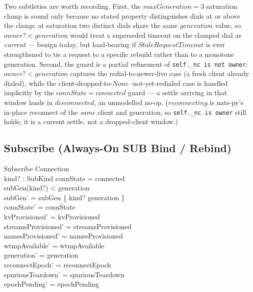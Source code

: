\documentclass[a4paper,10pt,fleqn]{article}
\begin{document}
Two subtleties are worth recording.  First, the $maxGeneration = 3$
saturation clamp is sound only because no stated property
distinguishes dials at or above the clamp: at saturation two
distinct dials share the same $generation$ value, so $owner? <
generation$ would treat a superseded timeout on the clamped dial as
\emph{current} --- benign today, but load-bearing if
$StaleRequestTimeout$ is ever strengthened to tie a request to a
specific rebuild rather than to a monotone generation.  Second, the
guard is a partial refinement of \texttt{self.\_nc is not owner}:
$owner? < generation$ captures the redial-to-newer-live case (a
fresh client already dialed), while the client-dropped-to-$None$
-not-yet-redialed case is handled implicitly by the $connState =
connected$ guard --- a settle arriving in that window lands in
$disconnected$, an unmodelled no-op.  ($reconnecting$ is nats-py's
in-place reconnect of the \emph{same} client and generation, so
\texttt{self.\_nc is owner} still holds; it is a current settle, not a
dropped-client window.)

\subsection{Subscribe (Always-On SUB Bind / Rebind)}

\begin{schema}{Subscribe}
  \Delta Connection \\
  kind? : SubKind
  \where
  connState = connected \\
  subGen(kind?) < generation \\
  subGen' = subGen \oplus \{ kind? \mapsto generation \} \\
  connState' = connState \\
  kvProvisioned' = kvProvisioned \\
  streamsProvisioned' = streamsProvisioned \\
  namesProvisioned' = namesProvisioned \\
  wtmpAvailable' = wtmpAvailable \\
  generation' = generation \\
  reconnectEpoch' = reconnectEpoch \\
  spuriousTeardown' = spuriousTeardown \\
  epochPending' = epochPending
\end{schema}
\end{document}
